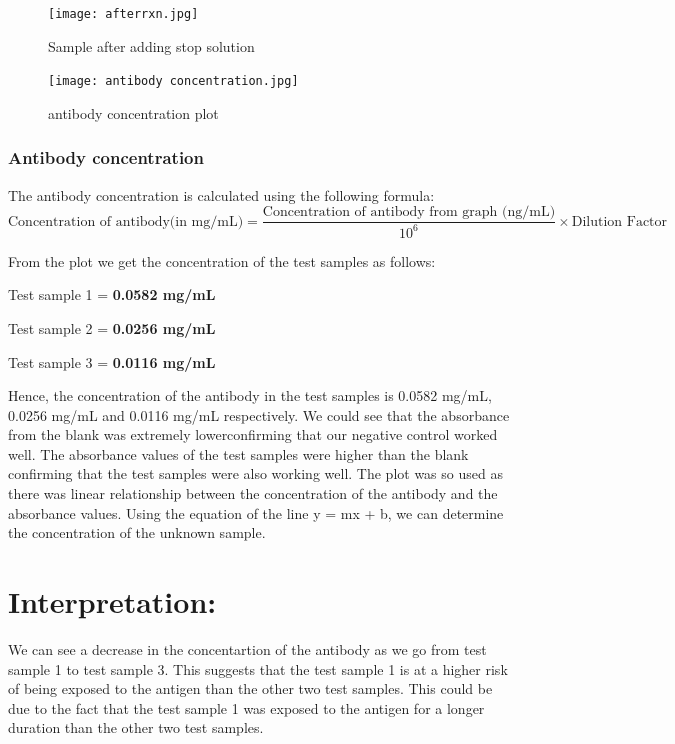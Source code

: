 \documentclass{report}
\begin{document}
  \begin{figure}[htbp]  
    \centering 
    \texttt{[image: afterrxn.jpg]} 
    \caption{Sample after adding stop solution}
    \label{fig: sample with stop solution }
  \end{figure}
 \vspace{5cm}


 \vspace{0.5cm}
 \begin{figure}
  \centering 
  \texttt{[image: antibody concentration.jpg]} 
  \caption{antibody concentration plot} 
  \label{fig: plot } 
 \end{figure}

\subsubsection*{Antibody concentration}
The antibody concentration is calculated using the following formula:
 \begin{equation}
   \text{Concentration of antibody(in mg/mL)} = \frac{\text{Concentration of antibody from graph (ng/mL)}}{10^{6}} \times {\text{Dilution Factor}}
 \end{equation}



From the plot we get the concentration of the test samples as follows:

Test sample 1 = \textbf{0.0582 mg/mL}

Test sample 2 = \textbf{0.0256 mg/mL}

Test sample 3 = \textbf{0.0116 mg/mL}

Hence, the concentration of the antibody in the test samples is 0.0582 mg/mL, 0.0256 mg/mL and 0.0116 mg/mL respectively. We could see that the absorbance from the blank was extremely lowerconfirming that our negative
control worked well. The absorbance values of the test samples were higher than the blank confirming that the test samples were also working well. 
The plot was so used as there was linear relationship between the concentration of the antibody and the absorbance values.
Using the equation of the line y = mx + b, we can determine the concentration of the unknown sample.

\section*{Interpretation:}

We can see a decrease in the concentartion of the antibody as we go from test sample 1 to test sample 3. 
This suggests that the test sample 1 is at a higher risk of being exposed to the antigen than the other two test samples.
This could be due to the fact that the test sample 1 was exposed to the antigen for a longer duration than the other two test samples.
\end{document}
